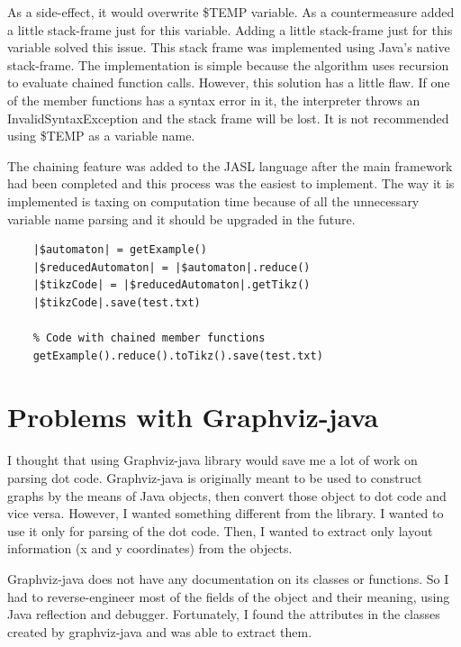 \documentclass{ctuthesis}
\begin{document}
As a side-effect, it would overwrite \$TEMP variable. As a countermeasure added a little stack-frame just for this variable. Adding a little stack-frame just for this variable solved this issue. This stack frame was implemented using Java's native stack-frame. The implementation is simple because the algorithm uses recursion to evaluate chained function calls. However, this solution has a little flaw. If one of the member functions has a syntax error in it, the interpreter throws an InvalidSyntaxException and the stack frame will be lost. It is not recommended using \$TEMP as a variable name. 

The chaining feature was added to the JASL language after the main framework had been completed and this process was the easiest to implement. The way it is implemented is taxing on computation time because of all the unnecessary variable name parsing and it should be upgraded in the future. 

\begin{minipage}{\linewidth}
\begin{lstlisting}[language = JASL]
	% Code without chained member function calls
	|$automaton| = getExample()
	|$reducedAutomaton| = |$automaton|.reduce()
	|$tikzCode| = |$reducedAutomaton|.getTikz()
	|$tikzCode|.save(test.txt)
	
	% Code with chained member functions
	getExample().reduce().toTikz().save(test.txt)
\end{lstlisting}
\end{minipage}

\section{Problems with Graphviz-java}
\label{subsec:graphviz-java-problems}
I thought that using Graphviz-java library would save me a lot of work on parsing dot code. Graphviz-java is originally meant to be used to construct graphs by the means of Java objects, then convert those object to dot code and vice versa. However, I wanted something different from the library. I wanted to use it only for parsing of the dot code. Then, I wanted to extract only layout information (x and y coordinates) from the objects. 

Graphviz-java does not have any documentation on its classes or functions. So I had to reverse-engineer most of the fields of the object and their meaning, using Java reflection and debugger. Fortunately, I found the attributes in the classes created by graphviz-java and was able to extract them. 
\end{document}
